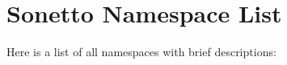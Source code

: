 \section{Sonetto Namespace List}
Here is a list of all namespaces with brief descriptions:\begin{CompactList}
\item{}
\item{}
\end{CompactList}
